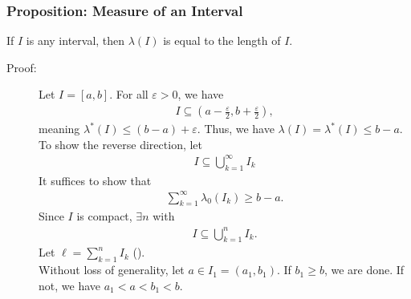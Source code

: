\documentclass[9pt]{extarticle}
\begin{document}
  \subsubsection{Proposition: Measure of an Interval}%
  If $I$ is any interval, then $\lambda(I)$ is equal to the length of $I$.
  \begin{description}
    \item[Proof:] Let $I = [a,b]$. For all $\varepsilon > 0$, we have
      \begin{align*}
        I\subseteq \left(a-\frac{\varepsilon}{2},b+\frac{\varepsilon}{2}\right),
      \end{align*}
      meaning $\lambda^{\ast}(I) \leq (b-a) + \varepsilon$. Thus, we have $\lambda(I) = \lambda^{\ast}(I) \leq b-a$. To show the reverse direction, let
      \begin{align*}
        I\subseteq \bigcup_{k=1}^{\infty}I_k \tag*{$I_k$ open.}
      \end{align*}
      It suffices to show that
      \begin{align*}
        \sum_{k=1}^{\infty}\lambda_0(I_k) \geq b-a.
      \end{align*}
      Since $I$ is compact, $\exists n$ with
      \begin{align*}
        I\subseteq \bigcup_{k=1}^{n}I_k.
      \end{align*}
      Let $\ell = \sum_{k=1}^{n}I_k$ (\textasteriskcentered).\\

      Without loss of generality, let $a\in I_1 = (a_1,b_1)$. If $b_1 \geq b$, we are done. If not, we have $a_1 < a < b_1 < b$.\\


\end{description}
\end{document}
